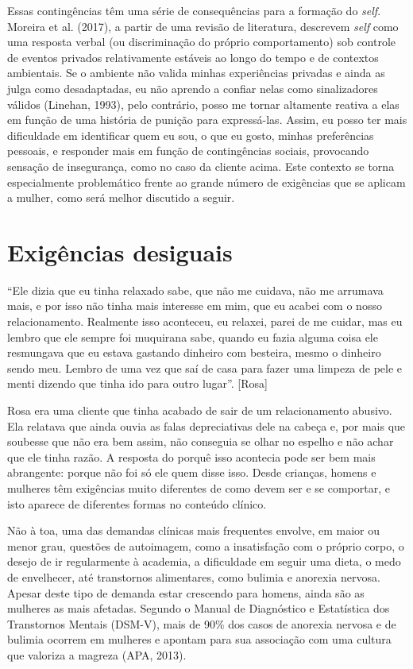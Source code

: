 Essas contingências têm uma série de consequências para a formação do \textit{self}. Moreira et al. (2017), a partir de uma revisão de literatura, descrevem \textit{self} como uma resposta verbal (ou discriminação do próprio comportamento) sob controle de eventos privados relativamente estáveis ao longo do tempo e de contextos ambientais. Se o ambiente não valida minhas experiências privadas e ainda as julga como desadaptadas, eu não aprendo a confiar nelas como sinalizadores válidos (Linehan, 1993), pelo contrário, posso me tornar altamente reativa a elas em função de uma história de punição para expressá-las. Assim, eu posso ter mais dificuldade em identificar quem eu sou, o que eu gosto, minhas preferências pessoais, e responder mais em função de contingências sociais, provocando sensação de insegurança, como no caso da cliente acima. Este contexto se torna especialmente problemático frente ao grande número de exigências que se aplicam a mulher, como será melhor discutido a seguir. 

\section*{Exigências desiguais}

``Ele dizia que eu tinha relaxado sabe, que não me cuidava, não me arrumava mais, e por isso não tinha mais interesse em mim, que eu acabei com o nosso relacionamento. Realmente isso aconteceu, eu relaxei, parei de me cuidar, mas eu lembro que ele sempre foi muquirana sabe, quando eu fazia alguma coisa ele resmungava que eu estava gastando dinheiro com besteira, mesmo o dinheiro sendo meu. Lembro de uma vez que saí de casa para fazer uma limpeza de pele e menti dizendo que tinha ido para outro lugar''. [Rosa]

Rosa era uma cliente que tinha acabado de sair de um relacionamento abusivo. Ela relatava que ainda ouvia as falas depreciativas dele na cabeça e, por mais que soubesse que não era bem assim, não conseguia se olhar no espelho e não achar que ele tinha razão. A resposta do porquê isso acontecia pode ser bem mais abrangente: porque não foi só ele quem disse isso. Desde crianças, homens e mulheres têm exigências muito diferentes de como devem ser e se comportar, e isto aparece de diferentes formas no conteúdo clínico. 

Não à toa, uma das demandas clínicas mais frequentes envolve, em maior ou menor grau, questões de autoimagem, como a insatisfação com o próprio corpo, o desejo de ir regularmente à academia, a dificuldade em seguir uma dieta, o medo de envelhecer, até transtornos alimentares, como bulimia e anorexia nervosa. Apesar deste tipo de demanda estar crescendo para homens, ainda são as mulheres as mais afetadas. Segundo o Manual de Diagnóstico e Estatística dos Transtornos Mentais (DSM-V), mais de 90\% dos casos de anorexia nervosa e de bulimia ocorrem em mulheres e apontam para sua associação com uma cultura que valoriza a magreza (APA, 2013).

